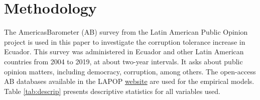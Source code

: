 \documentclass[12pt,a4]{article}\usepackage[]{graphicx}\usepackage[]{xcolor}
\begin{document}




\section{Methodology}
\label{sec:methodology} %

The AmericasBarometer (AB) survey from the Latin American Public Opinion project is used in this paper to investigate the corruption tolerance increase in Ecuador. This survey was administered in Ecuador and other Latin American countries from 2004 to 2019, at about two-year intervals. It asks about public opinion matters, including democracy, corruption, among others. The open-access AB databases available in the LAPOP \href{https://www.vanderbilt.edu/lapop/data-access.php}{website} are used for the empirical models. Table \ref{tab:descrip} presents descriptive statistics for all variables used.
\end{document}
